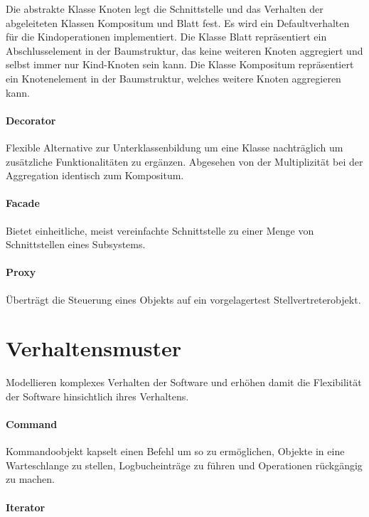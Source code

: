 Die abstrakte Klasse Knoten legt die Schnittstelle und das Verhalten der
abgeleiteten Klassen Kompositum und Blatt fest. Es wird ein Defaultverhalten für
die Kindoperationen implementiert. Die Klasse Blatt repräsentiert ein
Abschlusselement in der Baumstruktur, das keine weiteren Knoten aggregiert und
selbst immer nur Kind-Knoten sein kann. Die Klasse Kompositum repräsentiert ein
Knotenelement in der Baumstruktur, welches weitere Knoten aggregieren kann.

\paragraph{Decorator}\label{decorator}

Flexible Alternative zur Unterklassenbildung um eine Klasse nachträglich um
zusätzliche Funktionalitäten zu ergänzen.
Abgesehen von der Multiplizität bei der Aggregation identisch zum Kompositum.

\paragraph{Facade}\label{facade}

Bietet einheitliche, meist vereinfachte Schnittstelle zu einer Menge von
Schnittstellen eines Subsystems.

\paragraph{Proxy}\label{proxy}

Überträgt die Steuerung eines Objekts auf ein vorgelagertest
Stellvertreterobjekt.

\section{Verhaltensmuster}\label{verhaltensmuster}
Modellieren komplexes Verhalten der Software und erhöhen damit die Flexibilität
der Software hinsichtlich ihres Verhaltens.

\paragraph{Command}\label{command}

Kommandoobjekt kapselt einen Befehl um so zu ermöglichen, Objekte in eine
Warteschlange zu stellen, Logbucheinträge zu führen und Operationen rückgängig zu
machen.

\paragraph{Iterator}\label{iterator}

